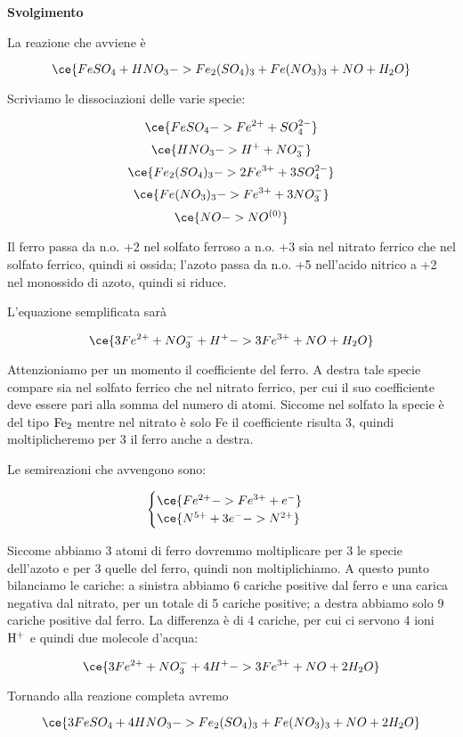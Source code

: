 \vspace{0.2cm}\large\textbf{Svolgimento}\normalsize

\vspace{0.2cm}La reazione che avviene è

$$\ce{FeSO_4 + HNO_3 -> Fe_2(SO_4)_3 + Fe(NO_3)_3 + NO + H_2O}$$

Scriviamo le dissociazioni delle varie specie:

$$\ce{FeSO_4 -> Fe^{2+} + SO_4^{2-}}$$
$$\ce{HNO_3 -> H^+ + NO_3^-}$$
$$\ce{Fe_2(SO_4)_3 -> 2Fe^{3+} + 3SO_4^{2-}}$$
$$\ce{Fe(NO_3)_3 -> Fe^{3+} + 3NO_3^-}$$
$$\ce{NO -> NO^{(0)}}$$

Il ferro passa da n.o. +2 nel solfato ferroso a n.o. +3 sia nel nitrato ferrico che nel solfato ferrico, quindi si ossida; l'azoto passa da n.o. +5 nell'acido nitrico a +2 nel monossido di azoto, quindi si riduce.

L'equazione semplificata sarà

$$\ce{3Fe^{2+} + NO_3^- + H^+ -> 3Fe^{3+} + NO + H_2O}$$

Attenzioniamo per un momento il coefficiente del ferro. A destra tale specie compare sia nel solfato ferrico che nel nitrato ferrico, per cui il suo coefficiente deve essere pari alla somma del numero di atomi. Siccome nel solfato la specie è del tipo $\rm Fe_2$ mentre nel nitrato è solo Fe il coefficiente risulta 3, quindi moltiplicheremo per 3 il ferro anche a destra.

Le semireazioni che avvengono sono:

$$\begin{cases}
    \ce{Fe^{2+} -> Fe^{3+} + e^-}\\
    \ce{N^{5+} +3e^- -> N^{2+}}
\end{cases}$$

Siccome abbiamo 3 atomi di ferro dovremmo moltiplicare per 3 le specie dell'azoto e per 3 quelle del ferro, quindi non moltiplichiamo. A questo punto bilanciamo le cariche: a sinistra abbiamo 6 cariche positive dal ferro e una carica negativa dal nitrato, per un totale di 5 cariche positive; a destra abbiamo solo 9 cariche positive dal ferro. La differenza è di 4 cariche, per cui ci servono 4 ioni $\rm H^+$ e quindi due molecole d'acqua:

$$\ce{3Fe^{2+} + NO_3^- + 4H^+ -> 3Fe^{3+} + NO + 2H_2O}$$

Tornando alla reazione completa avremo

$$\ce{3FeSO_4 + 4HNO_3 -> Fe_2(SO_4)_3 + Fe(NO_3)_3 + NO + 2H_2O}$$

